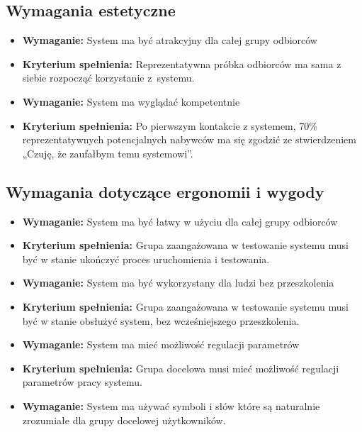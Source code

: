 \documentclass{article}
\begin{document}
\subsection{Wymagania estetyczne}
\begin{itemize}
\item \textbf{Wymaganie:} System ma być atrakcyjny dla całej grupy odbiorców
\item \textbf{Kryterium spełnienia:} Reprezentatywna próbka odbiorców ma sama z siebie rozpocząć korzystanie z~systemu.\\
\end{itemize}
\begin{itemize}
\item \textbf{Wymaganie:} System ma wyglądać kompetentnie
\item \textbf{Kryterium spełnienia:} Po pierwszym kontakcie z systemem, 70\% reprezentatywnych potencjalnych nabywców ma się zgodzić ze stwierdzeniem „Czuję, że zaufałbym temu systemowi”.
\end{itemize}

\subsection{Wymagania dotyczące ergonomii i wygody}
\begin{itemize}
\item \textbf{Wymaganie:} System ma być łatwy w użyciu dla całej grupy odbiorców 
\item \textbf{Kryterium spełnienia:} Grupa zaangażowana w testowanie systemu musi być w stanie ukończyć proces uruchomienia i testowania.\\
\end{itemize}
\begin{itemize}
\item \textbf{Wymaganie:} System ma być wykorzystany dla ludzi bez przeszkolenia
\item \textbf{Kryterium spełnienia:} Grupa zaangażowana w testowanie systemu musi być w stanie obsłużyć system, bez wcześniejszego przeszkolenia.\\
\end{itemize}
\begin{itemize}
\item \textbf{Wymaganie:} System ma mieć możliwość regulacji parametrów
\item \textbf{Kryterium spełnienia:} Grupa docelowa musi mieć możliwość regulacji parametrów pracy systemu.\\
\end{itemize}
\begin{itemize}
\item \textbf{Wymaganie:} System ma używać symboli i słów które są naturalnie zrozumiałe dla grupy docelowej użytkowników.
\end{itemize}
\end{document}
